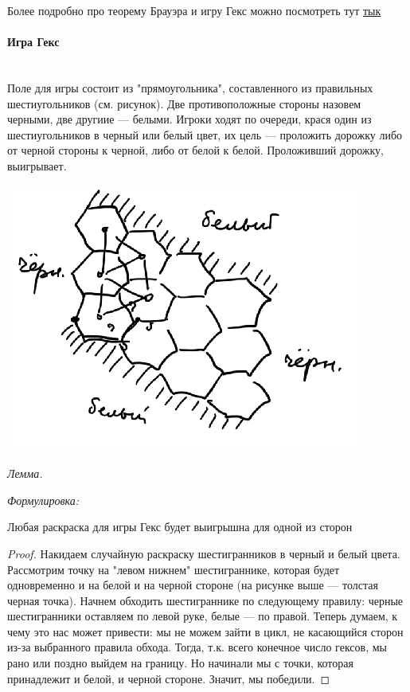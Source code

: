 \documentclass{article}
\let\vanillaparagraph\paragraph
\renewcommand{\paragraph}[1]{\vanillaparagraph{#1}\mbox{}\\}
\begin{document}
Более подробно про теорему Брауэра и игру Гекс можно посмотреть тут \href{https://arxiv.org/abs/1409.7890}{тык}

\paragraph{Игра Гекс}
Поле для игры состоит из "прямоугольника", составленного из правильных шестиугольников (см. рисунок). Две противоположные стороны назовем черными, две другиие --- белыми. Игроки ходят по очереди, крася один из шестиугольников в черный или белый цвет, их цель --- проложить дорожку либо от черной стороны к черной, либо от белой к белой. Проложивший дорожку, выигрывает.
\begin{center}
    \includegraphics[scale=0.44]{../images/Brauer's_th.png}
\end{center}

\textit{Лемма.}

\textit{Формулировка:}

Любая раскраска для игры Гекс будет выигрышна для одной из сторон

\begin{proof}
Накидаем случайную раскраску шестигранников в черный и белый цвета. Рассмотрим точку на "левом нижнем" шестиграннике, которая будет одновременно и на белой и на черной стороне (на рисунке выше --- толстая черная точка). Начнем обходить шестиграннике по следующему правилу: черные шестигранники оставляем по левой руке, белые --- по правой. Теперь думаем, к чему это нас может привести: мы не можем зайти в цикл, не касающийся сторон из-за выбранного правила обхода. Тогда, т.к. всего конечное число гексов, мы рано или поздно выйдем на границу. Но начинали мы с точки, которая принадлежит и белой, и черной стороне. Значит, мы победили.
\end{proof}
\end{document}
